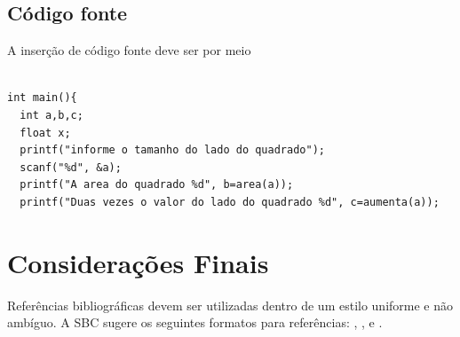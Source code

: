 \documentclass[12pt]{article}
\begin{document}
\subsection{Código fonte}
A inserção de código fonte deve ser por meio

\begin{lstlisting}

int main(){
  int a,b,c;
  float x;
  printf("informe o tamanho do lado do quadrado");
  scanf("%d", &a);
  printf("A area do quadrado %d", b=area(a));
  printf("Duas vezes o valor do lado do quadrado %d", c=aumenta(a));

\end{lstlisting}



\section{Considerações Finais}

Referências bibliográficas devem ser utilizadas dentro de um estilo uniforme e não ambíguo. A SBC sugere os seguintes formatos para referências: \cite{knuth:84}, \cite{boulic:91}, e \cite{smith:99}.



\end{document}
